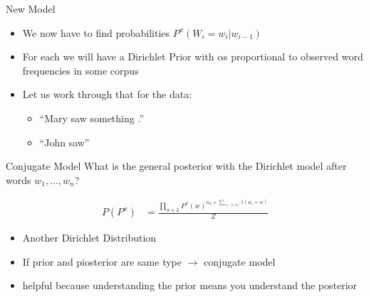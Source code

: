 \documentclass[11pt]{beamer}
\begin{document}
	\begin{frame}{New Model}
		\begin{itemize}
			\item<1-> We now have to find probabilities $P^{x}(W_i = w_i|w_{i-1})$
			\item<1-> For each we will have a Dirichlet Prior with $\alpha$s proportional to observed word frequencies in some corpus
			\item<2-> Let us work through that for the data:
				\begin{itemize}
					\item<2-> ``Mary saw something .''
					\item<2-> ``John saw''
				\end{itemize}
		\end{itemize}
	\end{frame}
	
	\begin{frame}{Conjugate Model}
		What is the general posterior with the Dirichlet model after words $w_1,\dots,w_n$?
		
		\begin{align}
			P(P^{x}) & = \frac{\prod_{w \in L} P^{x}(w)^{\alpha_{w}+\sum_{i \in [1,n]} 1(w_i = w)}}{Z}
		\end{align}			
		
		\begin{itemize}
			\item Another Dirichlet Distribution
			\item If prior and piosterior are same type $\rightarrow$ conjugate model
			\item helpful because understanding the prior means you understand the posterior
		\end{itemize}
	\end{frame}
	
\end{document}
